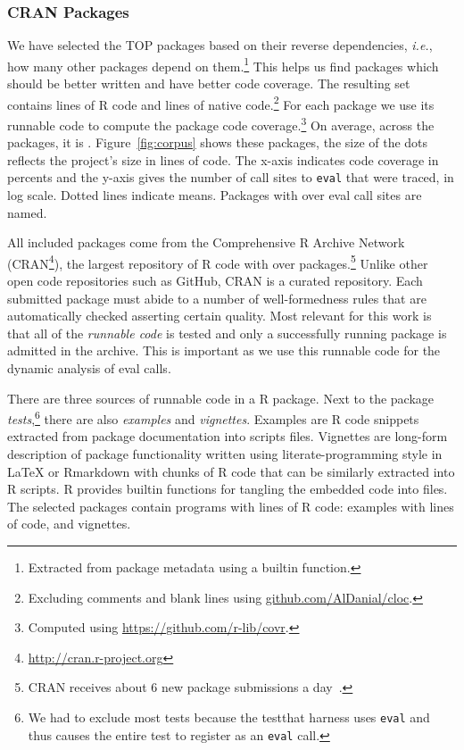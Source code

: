 \documentclass[USenglish,cleveref, autoref, thm-restate]{lipics-v2019}
\newcommand{\ie}{\emph{i.e.},\xspace}
\newcommand{\eval}{\texttt{eval}\xspace}
\begin{document}
\subsubsection{CRAN Packages}

We have selected the TOP \CorpusPackages packages based on their reverse
dependencies, \ie how many other packages depend on them.\footnote{Extracted
  from package metadata using a builtin function.}  This helps us find
packages which should be better written and have better code coverage.  The
resulting set contains \CorpusRCodeRnd lines of R code and
\CorpusNativeCodeRnd lines of native code.\footnote{Excluding comments and
  blank lines using \url{github.com/AlDanial/cloc}.}  For each package we
use its runnable code to compute the package code coverage.\footnote{Computed
  using \url{ https://github.com/r-lib/covr}.} On average, across the
\CorpusPackages packages, it is \CorpusMeanExprCoverage.
Figure~\ref{fig:corpus} shows these packages, the size of the dots reflects
the project's size in lines of code.  The x-axis indicates code coverage in
percents and the y-axis gives the number of call sites to \eval that were traced, in log
scale. Dotted lines indicate means. Packages with over
\CorpusEvalsPackageTreshold eval call sites are named.

All included packages come from the Comprehensive R Archive Network
(CRAN\footnote{\url{http://cran.r-project.org}}), the largest repository of R
code with over \CorpusAllCranRnd packages.\footnote{CRAN receives about 6 new
  package submissions a day~\cite{Ligges2017}.} Unlike other open code
repositories such as GitHub, CRAN is a curated repository. Each submitted
package must abide to a number of well-formedness rules that are automatically
checked asserting certain quality. Most relevant for this work is that all of
the \emph{runnable code} is tested and only a successfully running package is
admitted in the archive. This is important as we use this runnable code for the
dynamic analysis of eval calls.

There are three sources of runnable code in a R package. Next to the package
\emph{tests},\footnote{We had to exclude most tests because the {testthat}
  harness uses \eval and thus causes the entire test to register as an \eval
  call.} there are also \emph{examples} and \emph{vignettes}. Examples are R
code snippets extracted from package documentation into scripts files.
Vignettes are long-form description of package functionality written using
literate-programming style in \LaTeX\xspace or Rmarkdown with chunks of R
code that can be similarly extracted into R scripts. R provides builtin
functions for tangling the embedded code into files.  The selected packages
contain \CorpusPackagePrograms programs with \CorpusPackageProgramsCodeRnd
lines of R code: \CorpusExamplesProgramsRnd examples with
\CorpusExamplesCodeRnd lines of code, and \CorpusVignettesProgramsRnd
vignettes.
\end{document}
